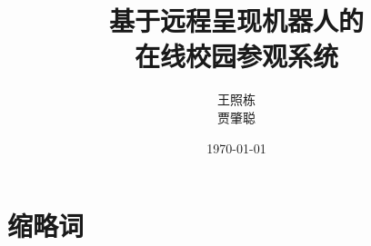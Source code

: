 \documentclass[12pt,letterpaper,oneside]{memoir}
\title{基于远程呈现机器人的\\
在线校园参观系统}
\author{王照栋\\
    贾肇聪}
\date{\today}
\begin{document}
\begin{figure}[t]
\vspace{3 cm}    %
\end{figure}

\titlep



\renewcommand{\chaptitlefont}{\normalfont\Large\bfseries}
\newpage
\tableofcontents*  %

\newpage
\listoffigures*  %

\renewcommand{\chaptitlefont}{\normalfont\Huge\bfseries}

\newpage
\section*{缩略词}
\label{sec-glossary}
\begin{description}
\end{description}
\end{document}
